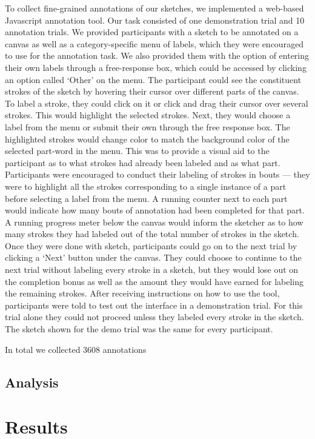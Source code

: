 \documentclass[10pt,letterpaper]{article}
\begin{document}
To collect fine-grained annotations of our sketches, we implemented a web-based Javascript annotation tool. 
Our task consisted of one demonstration trial and 10 annotation trials. 
We provided participants with a sketch to be annotated on a canvas as well as a category-specific menu of labels, which they were encouraged to use for the annotation task. 
We also provided them with the option of entering their own labels through a free-response box, which could be accessed by clicking an option called ‘Other’ on the menu. 
The participant could see the constituent strokes of the sketch by hovering their cursor over different parts of the canvas.  
To label a stroke, they could click on it or click and drag their cursor over several strokes. 
This would highlight the selected strokes. 
Next, they would choose a label from the menu or submit their own through the free response box. 
The highlighted strokes would change color to match the background color of the selected part-word in the menu. 
This was to provide a visual aid to the participant as to what strokes had already been labeled and as what part. Participants were encouraged to conduct their labeling of strokes in bouts — they were to highlight all the strokes corresponding to a single instance of a part before selecting a label from the menu. 
A running counter next to each part would indicate how many bouts of annotation had been completed for that part. 
A running progress meter below the canvas would inform the sketcher as to how many strokes they had labeled out of the total number of strokes in the sketch. 
Once they were done with sketch, participants could go on to the next trial by clicking a ‘Next’ button under the canvas. 
They could choose to continue to the next trial without labeling every stroke in a sketch, but they would lose out on the completion bonus as well as the amount they would have earned for labeling the remaining strokes.
After receiving instructions on how to use the tool, participants were told to test out the interface in a demonstration trial. 
For this trial alone they could not proceed unless they labeled every stroke in the sketch. 
The sketch shown for the demo trial was the same for every participant.

\noindent In total we collected 3608 annotations


\subsection{Analysis}


\section{Results}
\end{document}
